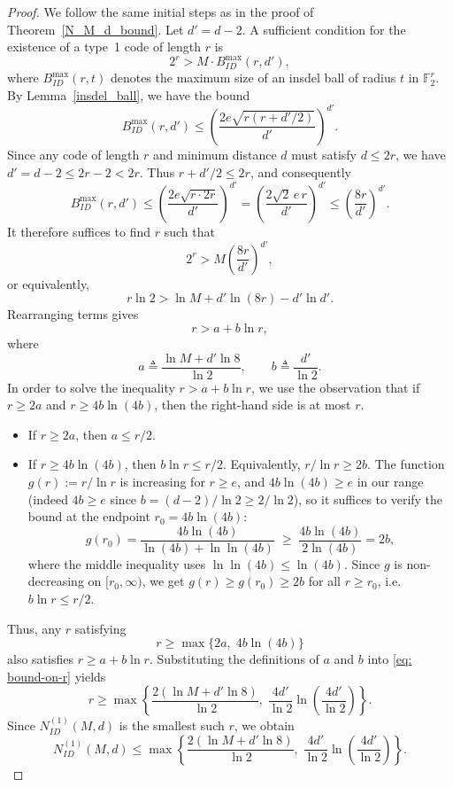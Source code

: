 \documentclass[11 pt]{article}
\numberwithin{equation}{section}
\begin{document}
    \begin{proof}
    We follow the same initial steps as in the proof of Theorem~\ref{N_M_d_bound}. Let $d' = d-2$. A sufficient condition for the existence of a type~1 code of length $r$ is
    \[
    2^r > M \cdot B^{\max}_{ID}(r,d'),
    \]
where $B^{\max}_{ID}(r,t)$ denotes the maximum size of an insdel ball of radius $t$ in $\mathbb{F}_2^r$.
\noindent By Lemma~\ref{insdel_ball}, we have the bound
\[
B^{\max}_{ID}(r,d') \le \left(\frac{2e\sqrt{r(r+d'/2)}}{d'}\right)^{d'}.
\]
Since any code of length $r$ and minimum distance $d$ must satisfy $d \le 2r$, we have $d' = d-2 \le 2r-2 < 2r$. Thus $r+d'/2 \le 2r$, and consequently
\[
B^{\max}_{ID}(r,d') \le \left(\frac{2e\sqrt{r \cdot 2r}}{d'}\right)^{d'}
= \left(\frac{2\sqrt{2}\,e\,r}{d'}\right)^{d'}
\le \left(\frac{8r}{d'}\right)^{d'}.
\]
\noindent It therefore suffices to find $r$ such that
\[
    2^r > M \left(\frac{8r}{d'}\right)^{d'},
\]
or equivalently,
\[
r \ln 2 > \ln M + d' \ln(8r) - d'\ln d'.
\]
Rearranging terms gives
\[
r > a + b \ln r,
\]
where
\[
a \triangleq \frac{\ln M + d'\ln 8}{\ln 2}, \qquad
b \triangleq \frac{d'}{\ln 2}.
\]
\noindent In order to solve the inequality $r > a + b\ln r$, we use the observation that if $r \ge 2a$ and $r \ge 4b\ln(4b)$, then the right-hand side is at most $r$.
\begin{itemize}
\item If $r \ge 2a$, then $a \le r/2$.
\item If $r \ge 4b\ln(4b)$, then $b\ln r \le r/2$.
  Equivalently, $r/\ln r \ge 2b$. The function $g(r) := r/\ln r$ is
  increasing for $r \ge e$, and $4b\ln(4b) \ge e$ in our range
  (indeed $4b \ge e$ since $b = (d-2)/\ln 2 \ge 2/\ln 2$), so it suffices
  to verify the bound at the endpoint $r_0 = 4b\ln(4b)$:
  \[
    g(r_0) = \frac{4b\ln(4b)}{\ln(4b) + \ln\ln(4b)}
           \;\ge\; \frac{4b\ln(4b)}{2\ln(4b)} = 2b,
  \]
  where the middle inequality uses $\ln\ln(4b) \le \ln(4b)$. Since $g$ is non-decreasing on $[r_0,\infty)$, we get $g(r) \ge g(r_0) \ge 2b$ for all $r \ge r_0$, i.e. $b\ln r \le r/2$.
\end{itemize}
Thus, any $r$ satisfying
\begin{equation}
\label{eq: bound-on-r}
    r \ge \max\{2a,\; 4b\ln(4b)\}
\end{equation}
also satisfies $r \ge a + b\ln r$.
Substituting the definitions of $a$ and $b$ into \eqref{eq: bound-on-r} yields
\[
r \ge \max\left\{
\frac{2(\ln M + d'\ln 8)}{\ln 2},\;
\frac{4d'}{\ln 2}\ln\!\left(\frac{4d'}{\ln 2}\right)
\right\}.
\]
Since $N^{(1)}_{ID}(M,d)$ is the smallest such $r$, we obtain
\[
N^{(1)}_{ID}(M,d) \le
\max\left\{
\frac{2(\ln M + d'\ln 8)}{\ln 2},\;
\frac{4d'}{\ln 2}\ln\!\left(\frac{4d'}{\ln 2}\right)
\right\} .
\]


\end{proof}
\end{document}
